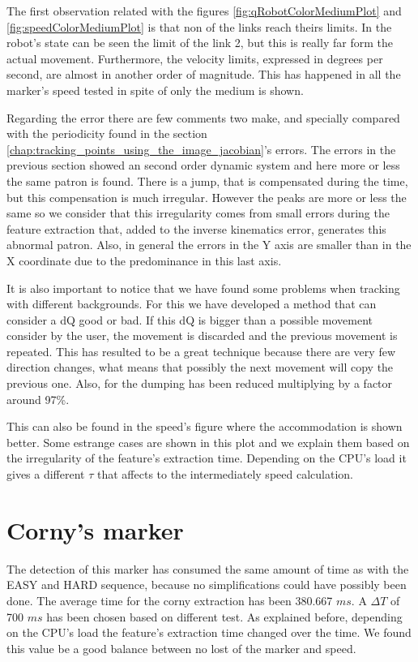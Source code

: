 		\ifx \plots \yes
			\qRobotColorMediumPlot
		\fi

		\ifx \plots \yes
			\speedColorMediumPlot
		\fi

		\ifx \plots \yes
			\errorColorPlot
		\fi

		The first observation related with the figures \ref{fig:qRobotColorMediumPlot} and \ref{fig:speedColorMediumPlot} is that non of the links reach theirs limits. 
		In the robot's state can be seen the limit of the link 2, but this is really far form the actual movement. 
		Furthermore, the velocity limits, expressed in degrees per second, are almost in another order of magnitude. This has happened in all the marker's speed tested in spite of only the medium is shown.

		Regarding the error there are few comments two make, and specially compared with the periodicity found in the section \ref{chap:tracking_points_using_the_image_jacobian}'s errors. 
		The errors in the previous section showed an second order dynamic system and here more or less the same patron is found. 
		There is a jump, that is compensated during the time, but this compensation is much irregular. 
		However the peaks are more or less the same so we consider that this irregularity comes from small errors during the feature extraction that, added to the inverse kinematics error, generates this abnormal patron. 
		Also, in general the errors in the Y axis are smaller than in the X coordinate due to the predominance in this last axis.

		It is also important to notice that we have found some problems when tracking with different backgrounds. 
		For this we have developed a method that can consider a dQ good or bad. 
		If this dQ is bigger than a possible movement consider by the user, the movement is discarded and the previous movement is repeated. 
		This has resulted to be a great technique because there are very few direction changes, what means that possibly the next movement will copy the previous one. Also, for the dumping has been reduced multiplying by a factor around 97\%.

		This can also be found in the speed's figure where the accommodation is shown better. 
		Some estrange cases are shown in this plot and we explain them based on the irregularity of the feature's extraction time. 
		Depending on the CPU's load it gives a different $\tau$ that affects to the intermediately speed calculation.

	\section{Corny's marker} %
	\label{sec:corny_s_marker}
	The detection of this marker has consumed the same amount of time as with the EASY and HARD sequence, because no simplifications could have possibly been done. 
		The average time for the corny extraction has been 380.667 $ms$. A $\Delta T$ of 700 $ms$ has been chosen based on different test. 
		As explained before, depending on the CPU's load the feature's extraction time changed over the time.
		We found this value be a good balance between no lost of the marker and speed.

